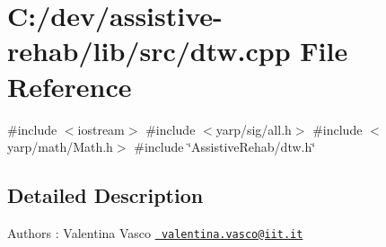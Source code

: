 \section{C\+:/dev/assistive-\/rehab/lib/src/dtw.cpp File Reference}
\label{dtw_8cpp}
{\ttfamily \#include $<$iostream$>$}\newline
{\ttfamily \#include $<$yarp/sig/all.\+h$>$}\newline
{\ttfamily \#include $<$yarp/math/\+Math.\+h$>$}\newline
{\ttfamily \#include \char`\"{}Assistive\+Rehab/dtw.\+h\char`\"{}}\newline


\subsection{Detailed Description}
\begin{DoxyAuthor}{Authors}
\+: Valentina Vasco \href{mailto:valentina.vasco@iit.it}{\texttt{ valentina.\+vasco@iit.\+it}} 
\end{DoxyAuthor}
